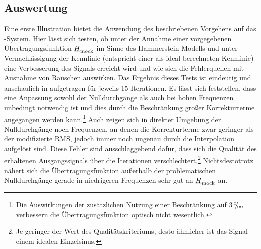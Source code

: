 \documentclass[../Report.tex]{subfiles}
\begin{document}
\subsection{Auswertung}
\label{subsec:opt.H.auswertung}
Eine erste Illustration bietet die Anwendung des beschriebenen Vorgehens auf das \mock-System. Hier lässt sich testen, ob unter der Annahme einer vorgegebenen Übertragungsfunktion  $\underline{H}_{ \mathrm{mock}}$ im Sinne des Hammerstein-Modells und unter Vernachlässigung der Kennlinie (entspricht einer als ideal berechneten Kennlinie) eine Verbesserung des Signals erreicht wird und wie sich die Fehlerquellen mit Ausnahme von Rauschen auswirken. 
Das Ergebnis dieses Tests ist eindeutig und anschaulich in  aufgetragen für jeweils 15 Iterationen. Es lässt sich feststellen, dass eine Anpassung sowohl der Nulldurchgänge als auch bei hohen Frequenzen unbedingt notwendig ist und dies durch die Beschränkung großer Korrekturterme angegangen werden kann.\footnote{Die Auswirkungen der zusätzlichen Nutzung einer Beschränkung auf $3 \, {}^\text{o}\mkern-5mu/\mkern-3mu_\text{oo}$ verbessern die Übertragungsfunktion optisch nicht wesentlich.}
Auch zeigen sich in direkter Umgebung der Nulldurchgänge noch Frequenzen, an denen die Korrekturterme zwar geringer als der modifizierte RMS, jedoch immer noch ungenau durch die Interpolation aufgelöst sind.
Diese Fehler sind ausschlaggebend dafür, dass sich die Qualität des erhaltenen Ausgangssignals über die Iterationen verschlechtert.\footnote{Je geringer der Wert des Qualitätskriteriums, desto ähnlicher ist das Signal einem idealen Einzelsinus.} Nichtsdestotrotz nähert sich die Übertragungsfunktion außerhalb der problematischen Nulldurchgänge gerade in niedrigeren Frequenzen sehr gut an $\underline{H}_{\mathrm{mock}}$ an. 
 
 
 \Hinit
{} \Hmock
{} \rmsHprom
{} \rmsHften
{} \simpleHften
\end{document}
